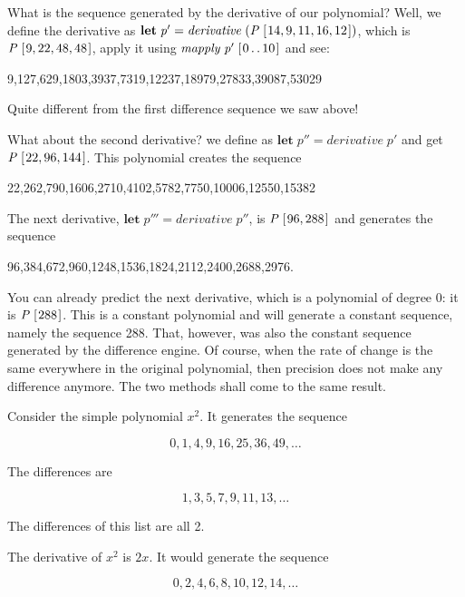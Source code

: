 \documentclass[tikz]{scrreprt}
\newcommand{\Conid}[1]{\mathit{#1}}
\newcommand{\Varid}[1]{\mathit{#1}}
\begin{document}
What is the sequence generated by the derivative of our polynomial?
Well, we define the derivative as
\ensuremath{\mathbf{let}\;\Varid{p'}\mathrel{=}\Varid{derivative}\;(\Conid{P}\;[\mskip1.5mu \mathrm{14},\mathrm{9},\mathrm{11},\mathrm{16},\mathrm{12}\mskip1.5mu])}, which is \ensuremath{\Conid{P}\;[\mskip1.5mu \mathrm{9},\mathrm{22},\mathrm{48},\mathrm{48}\mskip1.5mu]},
apply it using \ensuremath{\Varid{mapply}\;\Varid{p'}\;[\mskip1.5mu \mathrm{0}\mathinner{\ldotp\ldotp}\mathrm{10}\mskip1.5mu]} and see:

9,127,629,1803,3937,7319,12237,18979,27833,39087,53029

Quite different from the first difference sequence we saw above!

What about the second derivative? we define as
\ensuremath{\mathbf{let}\;\Varid{p''}\mathrel{=}\Varid{derivative}\;\Varid{p'}} and get \ensuremath{\Conid{P}\;[\mskip1.5mu \mathrm{22},\mathrm{96},\mathrm{144}\mskip1.5mu]}.
This polynomial creates the sequence

22,262,790,1606,2710,4102,5782,7750,10006,12550,15382

The next derivative, \ensuremath{\mathbf{let}\;\Varid{p'''}\mathrel{=}\Varid{derivative}\;\Varid{p''}},
is \ensuremath{\Conid{P}\;[\mskip1.5mu \mathrm{96},\mathrm{288}\mskip1.5mu]} and generates the sequence

96,384,672,960,1248,1536,1824,2112,2400,2688,2976.

You can already predict the next derivative,
which is a polynomial of degree 0: it is \ensuremath{\Conid{P}\;[\mskip1.5mu \mathrm{288}\mskip1.5mu]}.
This is a constant polynomial and will generate a constant
sequence, namely the sequence 288. That, however,
was also the constant sequence generated by the
difference engine. Of course, when the rate of change
is the same everywhere in the original polynomial,
then precision does not make any difference anymore.
The two methods shall come to the same result.

Consider the simple polynomial $x^2$.
It generates the sequence

\[
0,1,4,9,16,25,36,49,\dots
\]

The differences are

\[
1,3,5,7,9,11,13,\dots
\]

The differences of this list are all 2.

The derivative of $x^2$ is $2x$.
It would generate the sequence

\[
0,2,4,6,8,10,12,14,\dots
\]
\end{document}
